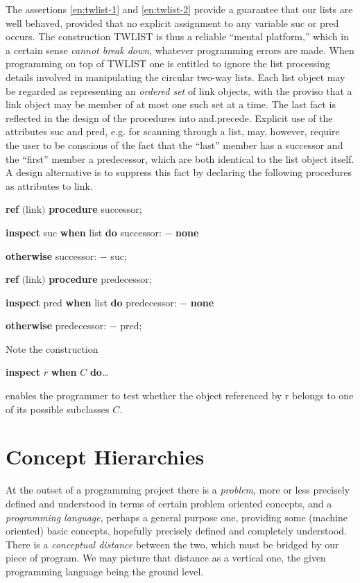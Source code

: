 The assertions \ref{en:twlist-1} and \ref{en:twlist-2} provide a guarantee that our lists are well behaved, provided that no explicit assignment to any variable suc or pred occurs. The construction TWLIST is thus a reliable ``mental platform,'' which in a certain sense \textit{cannot break down}, whatever programming errors are made. When programming on top of TWLIST one is entitled to ignore the list processing details involved in manipulating the circular two-way lists. Each list object may be regarded as representing an \textit{ordered set} of link objects, with the proviso that a link object may be member of at most one such set at a time. The last fact is reflected in the design of the procedures into and.precede. Explicit use of the attributes suc and pred, e.g. for scanning through a list, may, however, require the user to be conscious of the fact that the ``last'' member has a successor and the ``first'' member a predecessor, which are both identical to the list object itself. A design alternative is to suppress this fact by declaring the following procedures as attributes to link.

\quad \textbf{ref} $($link$)$ \textbf{procedure} successor;

\quad \quad \textbf{inspect} suc \textbf{when} list \textbf{do} successor: $-$ \textbf{none}

\quad \quad \textbf{otherwise} successor: $-$ suc;

\quad \textbf{ref} $($link$)$ \textbf{procedure} predecessor;

\quad \quad \textbf{inspect} pred \textbf{when} list \textbf{do} predecessor: $-$ \textbf{none}

\quad \quad \textbf{otherwise} predecessor: $-$ pred;

Note the construction

\quad \textbf{inspect} $r$ \textbf{when} $C$ \textbf{do}\dots

\noindent
enables the programmer to test whether the object referenced by r belongs to one of its possible subclasses $C$.

\section{Concept Hierarchies}

At the outset of a programming project there is a \textit{problem}, more or less precisely defined and understood in terms of certain problem oriented concepts, and a \textit{programming language}, perhaps a general purpose one, providing some (machine oriented) basic concepts, hopefully precisely defined and completely understood. There is a \textit{conceptual distance} between the two, which must be bridged by our piece of program. We may picture that distance as a vertical one, the given programming language being the ground level.

